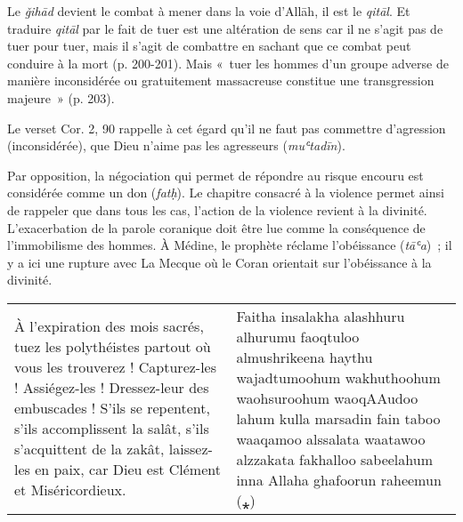 
Le \emph{ǧihād} devient le combat à mener dans la voie d'Allāh, il est
le \emph{qitāl}. Et traduire \emph{qitāl} par le fait de tuer est une
altération de sens car il ne s'agit pas de tuer pour tuer, mais il
s'agit de combattre en sachant que ce combat peut conduire à la mort (p.
200-201). Mais «~tuer les hommes d'un groupe adverse de manière
inconsidérée ou gratuitement massacreuse constitue une transgression
majeure~» (p. 203).





Le verset Cor. 2, 90 rappelle à cet égard qu'il ne faut pas commettre
d'agression (inconsidérée), que Dieu n'aime pas les agresseurs
(\emph{muʿtadīn}).

Par opposition, la négociation qui permet de répondre au risque encouru
est considérée comme un don (\emph{fatḥ}). Le chapitre consacré à la
violence permet ainsi de rappeler que dans tous les cas, l'action de la
violence revient à la divinité. L'exacerbation de la parole coranique
doit être lue comme la conséquence de l'immobilisme des hommes. À
Médine, le prophète réclame l'obéissance (\emph{tāʿa})~; il y a ici une
rupture avec La Mecque où le Coran orientait sur l'obéissance à la
divinité.

\begin{table}[h!]
    \centering
    \small
   \begin{tabular}{p{}p{} }
À l'expiration des mois sacrés, tuez les polythéistes partout où vous
les trouverez ! Capturez-les ! Assiégez-les ! Dressez-leur des
embuscades ! S'ils se repentent, s'ils accomplissent la salât, s'ils
s'acquittent de la zakât, laissez-les en paix, car Dieu est Clément et
Miséricordieux. & Faitha insalakha alashhuru alhurumu faoqtuloo
almushrikeena haythu wajadtumoohum wakhuthoohum waohsuroohum waoqAAudoo
lahum kulla marsadin fain taboo waaqamoo alssalata waatawoo alzzakata
fakhalloo sabeelahum inna Allaha ghafoorun raheemun (⁎) \\
 
\end{tabular}
\end{table}

